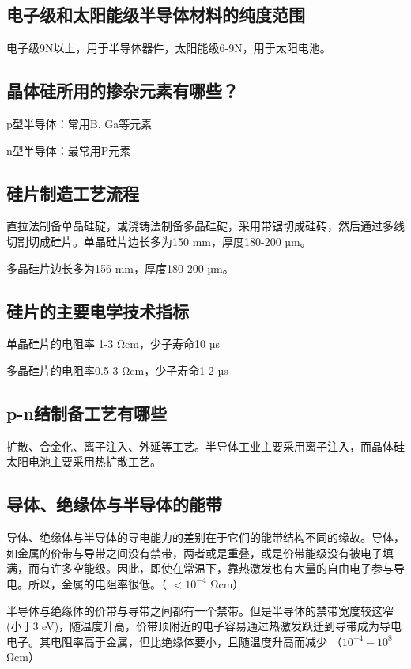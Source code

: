\documentclass{article}
\begin{document}
\subsection{电子级和太阳能级半导体材料的纯度范围}

电子级9N以上，用于半导体器件，太阳能级6-9N，用于太阳电池。

\subsection{晶体硅所用的掺杂元素有哪些？}

p型半导体：常用B, Ga等元素
 
n型半导体：最常用P元素  

\subsection{硅片制造工艺流程}

直拉法制备单晶硅碇，或浇铸法制备多晶硅碇，采用带锯切成硅砖，然后通过多线切割切成硅片。单晶硅片边长多为150 mm，厚度180-200 µm。

多晶硅片边长多为156 mm，厚度180-200 µm。

\subsection{硅片的主要电学技术指标}

单晶硅片的电阻率 1-3 Ωcm，少子寿命10 µs

多晶硅片的电阻率0.5-3 Ωcm，少子寿命1-2 µs

\subsection{p-n结制备工艺有哪些}

扩散、合金化、离子注入、外延等工艺。半导体工业主要采用离子注入，而晶体硅太阳电池主要采用热扩散工艺。

\subsection{导体、绝缘体与半导体的能带}

    导体、绝缘体与半导体的导电能力的差别在于它们的能带结构不同的缘故。导体，如金属的价带与导带之间没有禁带，两者或是重叠，或是价带能级没有被电子填满，而有许多空能级。因此，即使在常温下，靠热激发也有大量的自由电子参与导电。所以，金属的电阻率很低。（ $< 10^{-4}$ Ωcm） 
    
    半导体与绝缘体的价带与导带之间都有一个禁带。但是半导体的禁带宽度较这窄 (小于3 eV)，随温度升高，价带顶附近的电子容易通过热激发跃迁到导带成为导电电子。其电阻率高于金属，但比绝缘体要小，且随温度升高而减少 （$10^{-4}-10^8$ Ωcm） 
    
\end{document}
